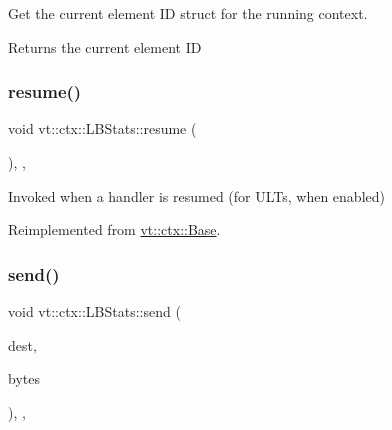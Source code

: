 Get the current element ID struct for the running context. 

\begin{DoxyReturn}{Returns}
the current element ID 
\end{DoxyReturn}
\mbox{\label{structvt_1_1ctx_1_1_l_b_stats_a099850f1bd53aafe650ed9e3958ca54b}} 
\subsubsection{\texorpdfstring{resume()}{resume()}}
{\footnotesize\ttfamily void vt\+::ctx\+::\+L\+B\+Stats\+::resume (\begin{DoxyParamCaption}{ }\end{DoxyParamCaption})\hspace{0.3cm}{\ttfamily [final]}, {\ttfamily [override]}, {\ttfamily [virtual]}}



Invoked when a handler is resumed (for U\+L\+Ts, when enabled) 



Reimplemented from \hyperlink{structvt_1_1ctx_1_1_base_a303afabb40ed83057fbe30c744db95da}{vt\+::ctx\+::\+Base}.

\mbox{\label{structvt_1_1ctx_1_1_l_b_stats_a59e0a2ee48beaf5a86f1a29b69b87f88}} 
\subsubsection{\texorpdfstring{send()}{send()}}
{\footnotesize\ttfamily void vt\+::ctx\+::\+L\+B\+Stats\+::send (\begin{DoxyParamCaption}\item[{\hyperlink{structvt_1_1elm_1_1_element_i_d_struct}{elm\+::\+Element\+I\+D\+Struct}}]{dest,  }\item[{\hyperlink{namespacevt_a408e86a8c7c89309b52907dc5a513924}{Msg\+Size\+Type}}]{bytes }\end{DoxyParamCaption})\hspace{0.3cm}{\ttfamily [final]}, {\ttfamily [override]}, {\ttfamily [virtual]}}




